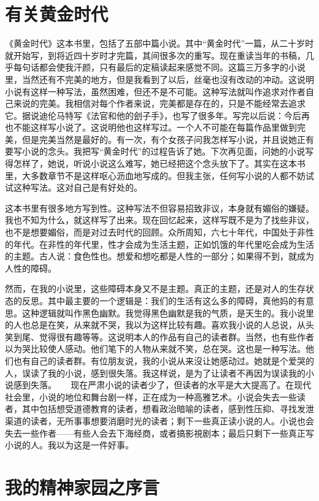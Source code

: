 \chapter{有关黄金时代}

《黄金时代》这本书里，包括了五部中篇小说。其中“黄金时代”一篇，从二十岁时就开始写，到将近四十岁时才完篇，其间很多次的重写。现在重读当年的书稿，几乎每句话都会使我汗颜，只有最后的定稿读起来感觉不同。这篇三万多字的小说里，当然还有不完美的地方，但是我看到了以后，丝毫也沒有改动的冲动。这说明小说有这样一种写法，虽然困难，但还不是不可能。这种写法就叫作追求对作者自己来说的完美。我相信对每个作者来说，完美都是存在的，只是不能经常去追求它。据说迪伦马特写《法官和他的刽子手》，也写了很多年。写完以后说：今后再也不能这样写小说了。这说明他也这样写过。一个人不可能在每篇作品里做到完美，但是完美当然是最好的。有一次，有个女孩子问我怎样写小说，并且说她正有要写小说的念头。我把写“黄金时代”的过程告诉了她。下次再见面，问她的小说写得怎样了，她说，听说小说这么难写，她已经把这个念头放下了。其实在这本书里，大多数章节不是这样呕心沥血地写成的。但我主张，任何写小说的人都不妨试试这种写法。这对自己是有好处的。　 

这本书里有很多地方写到性。这种写法不但容易招致非议，本身就有媚俗的嫌疑。我也不知为什么，就这样写了出来。现在回忆起来，这样写既不是为了找些非议，也不是想要媚俗，而是对过去时代的回顾。众所周知，六七十年代，中国处于非性的年代。在非性的年代里，性才会成为生活主题，正如饥饿的年代里吃会成为生活的主题。古人说：食色性也。想爱和想吃都是人性的一部分；如果得不到，就成为人性的障碍。　 

然而，在我的小说里，这些障碍本身又不是主题。真正的主题，还是对人的生存状态的反思。其中最主要的一个逻辑是：我们的生活有这么多的障碍，真他妈的有意思。这种逻辑就叫作黑色幽默。我觉得黑色幽默是我的气质，是天生的。我小说里的人也总是在笑，从来就不哭，我以为这样比较有趣。喜欢我小说的人总说，从头笑到尾、觉得很有趣等等。这说明本人的作品有自己的读者群。当然，也有些作者以为哭比较使人感动。他们笔下的人物从来就不笑，总在哭。这也是一种写法。他们也有自己的读者群。有位朋友说，我的小说从来沒让她感动过。她就是个爱哭的人，误读了我的小说，感到很失落。我这样说，是为了让读者不再因为误读我的小说感到失落。 　 现在严肃小说的读者少了，但读者的水平是大大提高了。在现代社会里，小说的地位和舞台剧一样，正在成为一种高雅艺术。小说会失去一些读者，其中包括想受道德教育的读者，想看政治暗喻的读者，感到性压抑、寻找发泄渠道的读者，无所事事想要消磨时光的读者；剩下一些真正读小说的人。小说也会失去一些作者——有些人会去下海经商，或者搞影視剧本；最后只剩下一些真正写小说的人。我以为这是一件好事。

\chapter{我的精神家园之序言}

